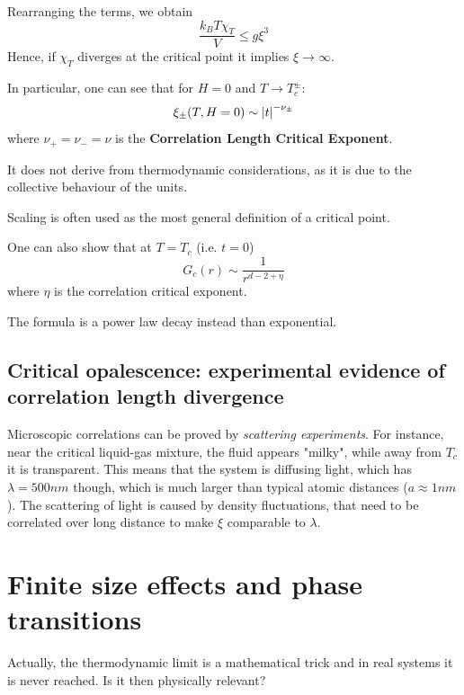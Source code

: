 \documentclass[../../Main/Main.tex]{subfiles}
\begin{document}
\noindent Rearranging the terms, we obtain
\begin{equation}
  \frac{k_B T \chi _T}{V} \leq g \xi ^3
\end{equation}
Hence, if \( \chi _T \) diverges at the critical point it implies \( \xi \rightarrow \infty  \).

In particular, one can see that for \( H=0 \) and \( T \rightarrow T_c^\pm \):
\begin{equation}
  \xi _\pm (T,H=0) \sim \abs{t}^{- \nu _\pm}
  \label{eq:5_2}
\end{equation}
where \( \nu _+ = \nu _- = \nu  \) is the \textbf{Correlation Length Critical Exponent}.
\begin{remark}
It does not derive from thermodynamic considerations, as it is due to the collective behaviour of the units.
\end{remark}
\noindent Scaling is often used as the most general definition of a critical point. 

One can also show that at \( T=T_c \) (i.e. \( t=0 \))
\begin{equation}
  G_c (r) \sim \frac{1}{r^{d-2+\eta }}
\end{equation}
where \( \eta  \) is the correlation critical exponent.
\begin{remark}
The formula is a power law decay instead than exponential.
\end{remark}

\subsection{Critical opalescence: experimental evidence of correlation length divergence}
Microscopic correlations can be proved by \textit{scattering experiments}. For instance, near the critical liquid-gas mixture, the fluid appears "milky", while away from $T_c$ it is transparent. This means that the system is diffusing light, which has $\lambda=500nm$ though, which is much larger than typical atomic distances ($a \approx 1nm$). The scattering of light is caused by density fluctuations, that need to be correlated over long distance to make $\xi$ comparable to $\lambda$.

\section{Finite size effects and phase transitions}
Actually, the thermodynamic limit is a mathematical trick and in real systems it is never reached. Is it then physically relevant?
\end{document}
